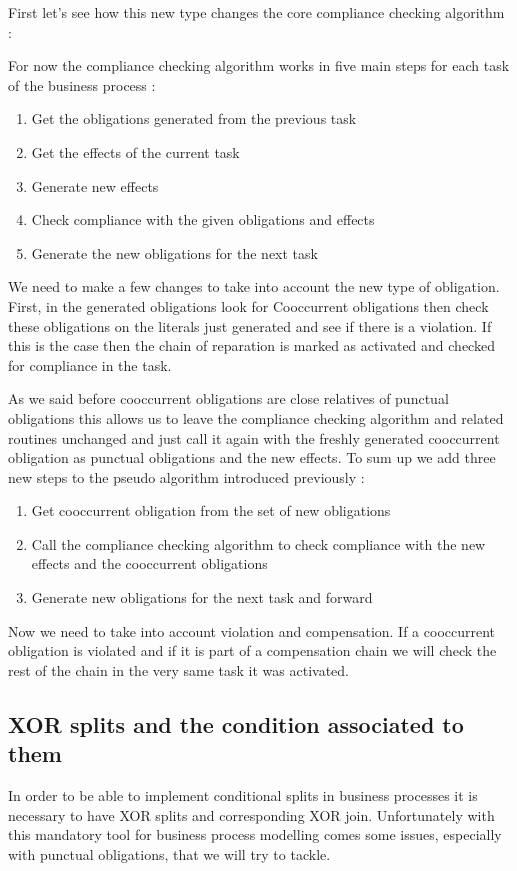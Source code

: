 \documentclass[10pt]{report}
\begin{document}
First let's see how this new type changes the core compliance checking algorithm :

For now the compliance checking algorithm works in five main steps for each task of the business process :
\begin{enumerate}
\item Get the obligations generated from the previous task
\item Get the effects of the current task
\item Generate new effects
\item Check compliance with the given obligations and effects
\item Generate the new obligations for the next task
\end{enumerate}

We need to make a few changes to take into account the new type of obligation. First, in the generated obligations look for Cooccurrent obligations then check these obligations on the literals just generated and see if there is a violation. If this is the case then the chain of reparation is marked as activated and checked for compliance in the task.

As we said before cooccurrent obligations are close relatives of punctual obligations this allows us to leave the compliance checking algorithm and related routines unchanged and just call it again with the freshly generated cooccurrent obligation as punctual obligations and the new effects. To sum up we add three new steps to the pseudo algorithm introduced previously :
\begin{enumerate}
\item Get cooccurrent obligation from the set of new obligations
\item Call the compliance checking algorithm to check compliance with the new effects and the cooccurrent obligations
\item Generate new obligations for the next task and forward
\end{enumerate}

Now we need to take into account violation and compensation. If a cooccurrent obligation is violated and if it is part of a compensation chain we will check the rest of the chain in the very same task it was activated.



\subsection{XOR splits and the condition associated to them}
In order to be able to implement conditional splits in business processes it is necessary to have XOR splits and corresponding XOR join. Unfortunately with this mandatory tool for business process modelling comes some issues, especially with punctual obligations, that we will try to tackle.
\end{document}
